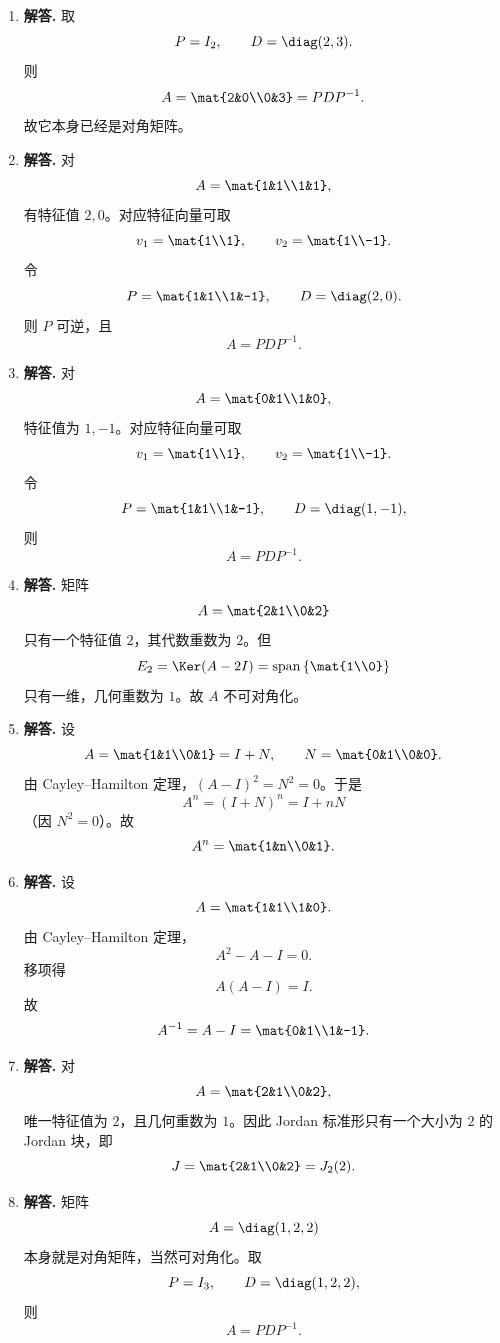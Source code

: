 \begin{enumerate}[label=\textbf{\arabic*.}, leftmargin=*, itemsep=1em]
\item \textbf{解答.} 取
\[
P=I_2,\qquad D=\diag(2,3).
\]
则
\[
A=\mat{2&0\\0&3}=PDP^{-1}.
\]
故它本身已经是对角矩阵。

\item \textbf{解答.} 对
\[
A=\mat{1&1\\1&1},
\]
有特征值 \(2,0\)。对应特征向量可取
\[
v_1=\mat{1\\1},\qquad v_2=\mat{1\\-1}.
\]
令
\[
P=\mat{1&1\\1&-1},\qquad D=\diag(2,0).
\]
则 \(P\) 可逆，且
\[
A=PDP^{-1}.
\]

\item \textbf{解答.} 对
\[
A=\mat{0&1\\1&0},
\]
特征值为 \(1,-1\)。对应特征向量可取
\[
v_1=\mat{1\\1},\qquad v_2=\mat{1\\-1}.
\]
令
\[
P=\mat{1&1\\1&-1},\qquad D=\diag(1,-1),
\]
则
\[
A=PDP^{-1}.
\]

\item \textbf{解答.} 矩阵
\[
A=\mat{2&1\\0&2}
\]
只有一个特征值 \(2\)，其代数重数为 \(2\)。但
\[
E_2=\Ker(A-2I)=\operatorname{span}\left\{\mat{1\\0}\right\}
\]
只有一维，几何重数为 \(1\)。故 \(A\) 不可对角化。

\item \textbf{解答.} 设
\[
A=\mat{1&1\\0&1}=I+N,\qquad N=\mat{0&1\\0&0}.
\]
由 Cayley--Hamilton 定理，\((A-I)^2=N^2=0\)。于是
\[
A^n=(I+N)^n=I+nN
\]
（因 \(N^2=0\)）。故
\[
A^n=\mat{1&n\\0&1}.
\]

\item \textbf{解答.} 设
\[
A=\mat{1&1\\1&0}.
\]
由 Cayley--Hamilton 定理，
\[
A^2-A-I=0.
\]
移项得
\[
A(A-I)=I.
\]
故
\[
A^{-1}=A-I=\mat{0&1\\1&-1}.
\]

\item \textbf{解答.} 对
\[
A=\mat{2&1\\0&2},
\]
唯一特征值为 \(2\)，且几何重数为 \(1\)。因此 Jordan 标准形只有一个大小为 \(2\) 的 Jordan 块，即
\[
J=\mat{2&1\\0&2}=J_2(2).
\]

\item \textbf{解答.} 矩阵
\[
A=\diag(1,2,2)
\]
本身就是对角矩阵，当然可对角化。取
\[
P=I_3,\qquad D=\diag(1,2,2),
\]
则
\[
A=PDP^{-1}.
\]


\end{enumerate}
